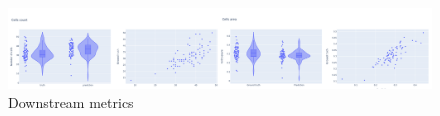 \begin{figure}[H]
	\begin{center}
		\includegraphics[width=\linewidth]{bilder/gfp/binary-bce/gfp-bce-metrics.png}
		\caption{Downstream metrics}\label{fig:gfp-bce-metrics}
	\end{center}
\end{figure}